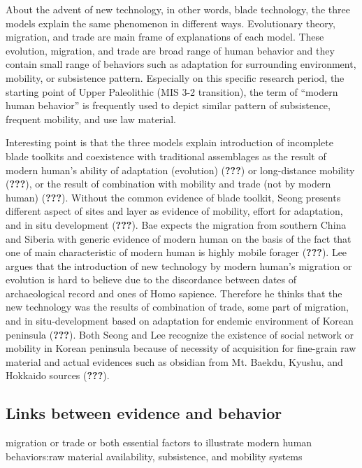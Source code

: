 \documentclass[american,man]{apa6}
\begin{document}
About the advent of new technology, in other words, blade technology,
the three models explain the same phenomenon in different ways.
Evolutionary theory, migration, and trade are main frame of explanations
of each model. These evolution, migration, and trade are broad range of
human behavior and they contain small range of behaviors such as
adaptation for surrounding environment, mobility, or subsistence
pattern. Especially on this specific research period, the starting point
of Upper Paleolithic (MIS 3-2 transition), the term of \enquote{modern
human behavior} is frequently used to depict similar pattern of
subsistence, frequent mobility, and use law material.

Interesting point is that the three models explain introduction of
incomplete blade toolkits and coexistence with traditional assemblages
as the result of modern human's ability of adaptation (evolution)
({\textbf{???}}) or long-distance mobility ({\textbf{???}}), or the
result of combination with mobility and trade (not by modern human)
({\textbf{???}}). Without the common evidence of blade toolkit, Seong
presents different aspect of sites and layer as evidence of mobility,
effort for adaptation, and in situ development ({\textbf{???}}). Bae
expects the migration from southern China and Siberia with generic
evidence of modern human on the basis of the fact that one of main
characteristic of modern human is highly mobile forager
({\textbf{???}}). Lee argues that the introduction of new technology by
modern human's migration or evolution is hard to believe due to the
discordance between dates of archaeological record and ones of Homo
sapience. Therefore he thinks that the new technology was the results of
combination of trade, some part of migration, and in situ-development
based on adaptation for endemic environment of Korean peninsula
({\textbf{???}}). Both Seong and Lee recognize the existence of social
network or mobility in Korean peninsula because of necessity of
acquisition for fine-grain raw material and actual evidences such as
obsidian from Mt. Baekdu, Kyushu, and Hokkaido sources ({\textbf{???}}).

\subsection{Links between evidence and
behavior}\label{links-between-evidence-and-behavior-1}

migration or trade or both essential factors to illustrate modern human
behaviors:raw material availability, subsistence, and mobility systems
\end{document}
